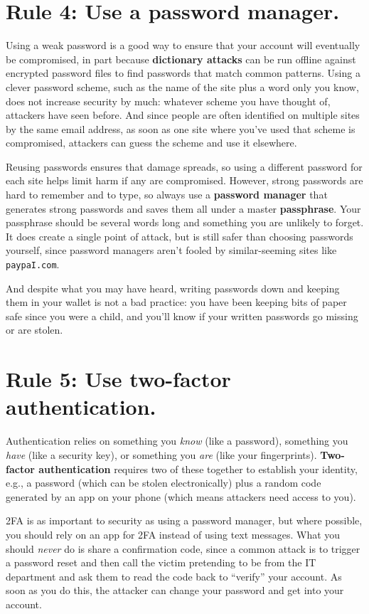 \documentclass[10pt,letterpaper]{article}
\begin{document}
\section*{Rule 4: Use a password manager.}

Using a weak password is a good way to ensure that your account will eventually be compromised,
in part because \textbf{dictionary attacks} can be run offline against encrypted password files
to find passwords that match common patterns.
Using a clever password scheme,
such as the name of the site plus a word only you know,
does not increase security by much:
whatever scheme you have thought of,
attackers have seen before.
And since people are often identified on multiple sites by the same email address,
as soon as one site where you've used that scheme is compromised,
attackers can guess the scheme and use it elsewhere.

Reusing passwords ensures that damage spreads,
so using a different password for each site helps limit harm if any are compromised.
However,
strong passwords are hard to remember and to type,
so always use a \textbf{password manager}
that generates strong passwords
and saves them all under a master \textbf{passphrase}.
Your passphrase should be several words long
and something you are unlikely to forget.
It does create a single point of attack,
but is still safer than choosing passwords yourself,
since password managers aren't fooled by similar-seeming sites like \texttt{paypaI.com}.

And despite what you may have heard,
writing passwords down and keeping them in your wallet is not a bad practice:
you have been keeping bits of paper safe since you were a child,
and you'll know if your written passwords go missing or are stolen.

\section*{Rule 5: Use two-factor authentication.}

Authentication relies on something you \emph{know} (like a password),
something you \emph{have} (like a security key),
or something you \emph{are} (like your fingerprints).
\textbf{Two-factor authentication} requires two of these together to establish your identity,
e.g.,
a password (which can be stolen electronically)
plus a random code generated by an app on your phone
(which means attackers need access to you).

2FA is as important to security as using a password manager,
but where possible,
you should rely on an app for 2FA instead of using text messages.
What you should \emph{never} do is share a confirmation code,
since a common attack is to trigger a password reset
and then call the victim pretending to be from the IT department
and ask them to read the code back to ``verify'' your account.
As soon as you do this,
the attacker can change your password and get into your account.
\end{document}
